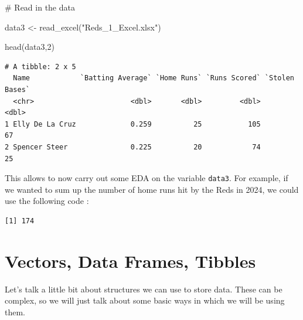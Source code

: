 \documentclass[
  letterpaper,
  DIV=11,
  numbers=noendperiod]{scrreprt}
\newenvironment{Shaded}{\begin{snugshade}}{\end{snugshade}}
\newcommand{\AttributeTok}[1]{\textcolor[rgb]{0.40,0.45,0.13}{#1}}
\newcommand{\CommentTok}[1]{\textcolor[rgb]{0.37,0.37,0.37}{#1}}
\newcommand{\DecValTok}[1]{\textcolor[rgb]{0.68,0.00,0.00}{#1}}
\newcommand{\FunctionTok}[1]{\textcolor[rgb]{0.28,0.35,0.67}{#1}}
\newcommand{\NormalTok}[1]{\textcolor[rgb]{0.00,0.23,0.31}{#1}}
\newcommand{\OtherTok}[1]{\textcolor[rgb]{0.00,0.23,0.31}{#1}}
\newcommand{\SpecialCharTok}[1]{\textcolor[rgb]{0.37,0.37,0.37}{#1}}
\newcommand{\StringTok}[1]{\textcolor[rgb]{0.13,0.47,0.30}{#1}}
\begin{document}
\begin{Shaded}
\begin{Highlighting}[]
\CommentTok{\# Read in the data}

\NormalTok{data3 }\OtherTok{\textless{}{-}} \FunctionTok{read\_excel}\NormalTok{(}\StringTok{"Reds\_1\_Excel.xlsx"}\NormalTok{)}

\FunctionTok{head}\NormalTok{(data3,}\DecValTok{2}\NormalTok{)}
\end{Highlighting}
\end{Shaded}

\begin{verbatim}
# A tibble: 2 x 5
  Name            `Batting Average` `Home Runs` `Runs Scored` `Stolen Bases`
  <chr>                       <dbl>       <dbl>         <dbl>          <dbl>
1 Elly De La Cruz             0.259          25           105             67
2 Spencer Steer               0.225          20            74             25
\end{verbatim}

This allows to now carry out some EDA on the variable \texttt{data3}.
For example, if we wanted to sum up the number of home runs hit by the
Reds in 2024, we could use the following code :

\begin{Shaded}
\end{Shaded}

\begin{verbatim}
[1] 174
\end{verbatim}


\chapter*{Vectors, Data Frames,
Tibbles}\label{vectors-data-frames-tibbles}


Let's talk a little bit about structures we can use to store data. These
can be complex, so we will just talk about some basic ways in which we
will be using them.
\end{document}

